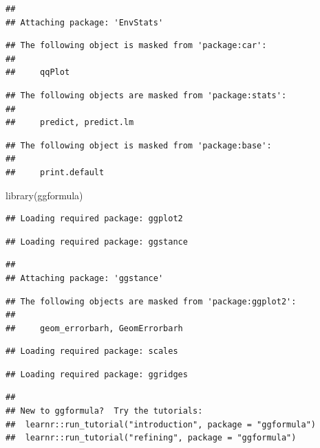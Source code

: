 \documentclass[
]{article}
\newenvironment{Shaded}{\begin{snugshade}}{\end{snugshade}}
\newcommand{\FunctionTok}[1]{\textcolor[rgb]{0.00,0.00,0.00}{#1}}
\newcommand{\NormalTok}[1]{#1}
\begin{document}
\begin{verbatim}
## 
## Attaching package: 'EnvStats'
\end{verbatim}

\begin{verbatim}
## The following object is masked from 'package:car':
## 
##     qqPlot
\end{verbatim}

\begin{verbatim}
## The following objects are masked from 'package:stats':
## 
##     predict, predict.lm
\end{verbatim}

\begin{verbatim}
## The following object is masked from 'package:base':
## 
##     print.default
\end{verbatim}

\begin{Shaded}
\begin{Highlighting}[]
\FunctionTok{library}\NormalTok{(ggformula)}
\end{Highlighting}
\end{Shaded}

\begin{verbatim}
## Loading required package: ggplot2
\end{verbatim}

\begin{verbatim}
## Loading required package: ggstance
\end{verbatim}

\begin{verbatim}
## 
## Attaching package: 'ggstance'
\end{verbatim}

\begin{verbatim}
## The following objects are masked from 'package:ggplot2':
## 
##     geom_errorbarh, GeomErrorbarh
\end{verbatim}

\begin{verbatim}
## Loading required package: scales
\end{verbatim}

\begin{verbatim}
## Loading required package: ggridges
\end{verbatim}

\begin{verbatim}
## 
## New to ggformula?  Try the tutorials: 
##  learnr::run_tutorial("introduction", package = "ggformula")
##  learnr::run_tutorial("refining", package = "ggformula")
\end{verbatim}
\end{document}

